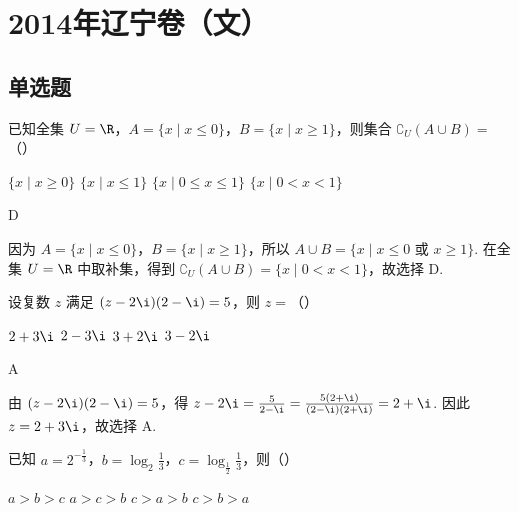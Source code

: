 
\chapter{2014年辽宁卷（文）}

\section{单选题}

\begin{problem}
已知全集 \(U = \R\)，\(A = \{x \mid x \leqslant 0\}\)，\(B = \{x \mid x \geqslant 1\}\)，则集合 \(\complement_{U}(A \cup B)=\)（\quad）

\choices
    {\( \{x \mid x \geqslant 0\} \)}
    {\(\{x\mid x\leqslant 1\}\)}
    {\(\{x\mid 0\leqslant x\leqslant 1\}\)}
    {\(\{x\mid 0 < x < 1\}\)}
\end{problem}

\begin{answer}
D
\end{answer}

\begin{solution}
因为 \(A=\{x\mid x\leqslant0\}\)，\(B=\{x\mid x\geqslant1\}\)，所以
\(A\cup B=\{x\mid x\leqslant0\text{ 或 }x\geqslant1\}\). 在全集 \(U=\R\) 中取补集，得到
\(\complement_U(A\cup B)=\{x\mid0<x<1\}\)，故选择 D.
\end{solution}

\begin{problem}
设复数 \(z\) 满足 \((z - 2\i)(2 - \i) = 5\)，则 \(z =\)（\quad）

\choices
    {\(2 + 3\i\)}
    {\(2 - 3\i\)}
    {\(3 + 2\i\)}
    {\(3 - 2\i\)}
\end{problem}

\begin{answer}
A
\end{answer}

\begin{solution}
由 \((z-2\i)(2-\i)=5\)，得
\(z-2\i=\frac{5}{2-\i}=\frac{5(2+\i)}{(2-\i)(2+\i)}=2+\i\).
因此 \(z=2+3\i\)，故选择 A.
\end{solution}

\begin{problem}
已知 \(a = 2^{-\frac{1}{3}}\)，\(b = \log_{2} \frac{1}{3}\)，\(c = \log_{\frac{1}{2}} \frac{1}{3}\)，则（\quad）

\choices
    {\(a > b > c\)}
    {\(a > c > b\)}
    {\(c > a > b\)}
    {\(c > b > a\)}
\end{problem}

